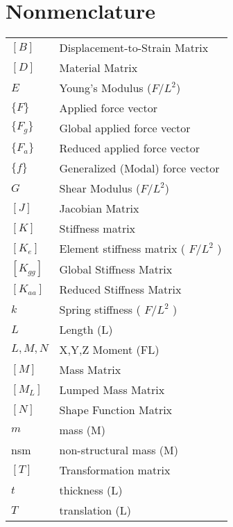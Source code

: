 \section{Nonmenclature}

\begin{tabular}{ll}
    $[B]$      & Displacement-to-Strain Matrix        \\
    $[D]$      & Material Matrix                      \\
    $E$        & Young's Modulus ($F/L^2$)            \\
    $\{F\}$    & Applied force vector                 \\
    $\{F_g\}$  & Global  applied force vector         \\
    $\{F_a\}$  & Reduced applied force vector         \\
    $\{f\}$    & Generalized (Modal) force vector     \\
    $G$        & Shear Modulus ($F/L^2$)              \\
    $[J]$      & Jacobian Matrix                      \\
    $[K]$      & Stiffness matrix                     \\
    $[K_e]$    & Element stiffness matrix ( $ F/ L^2$ ) \\
    $[K_{gg}]$ & Global  Stiffness Matrix             \\
    $[K_{aa}]$ & Reduced Stiffness Matrix             \\
    $k$        & Spring stiffness ( $ F/L^2$ )        \\
    $L$        & Length (L)                           \\
    $L,M,N$    & X,Y,Z Moment (FL)                    \\
    $[M]$      & Mass Matrix                          \\
    $[M_L]$    & Lumped Mass Matrix                   \\
    $[N]$      & Shape Function Matrix                \\
    $m$        & mass (M)                             \\
    nsm        & non-structural mass (M)              \\
    $[T]$      & Transformation matrix                \\
    $t$        & thickness (L)                        \\
    $T$        & translation (L)                      \\

\end{tabular}
